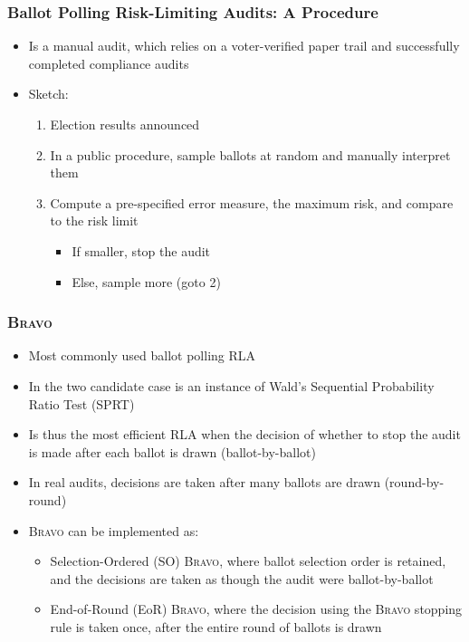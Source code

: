 \documentclass[aspectratio=169]{beamer}
\newcommand{\BRAVO}{\textsc{Bravo}\xspace}
\begin{document}
\begin{frame}
\frametitle{Ballot Polling Risk-Limiting Audits: A Procedure}

\begin{itemize}
\item Is a manual audit, which relies on a voter-verified paper trail and successfully completed compliance audits
\pause 
\item Sketch:
\begin{enumerate}
\item Election results announced
\pause 
\item In a public procedure, sample ballots at random and manually interpret them
\pause 
\item Compute a pre-specified error measure, the maximum risk, and compare to the risk limit
\begin{itemize}
\item If smaller, stop the audit
\item Else, sample more (goto 2)
\end{itemize}
\end{enumerate}
\end{itemize}
\end{frame}

\begin{frame}
\frametitle{\BRAVO}
\begin{itemize}
\item Most commonly used ballot polling RLA
\pause 
\item In the two candidate case is an instance of Wald's Sequential Probability Ratio Test (SPRT)
\pause 
\item Is thus the most efficient RLA when 
the decision of whether to stop the audit is made after each ballot is drawn (ballot-by-ballot)
\pause 
\item In real audits, decisions are taken after many ballots are drawn (round-by-round)
\pause 
\item \BRAVO can be implemented as:
\begin{itemize}
\item Selection-Ordered (SO) \BRAVO, 
where ballot selection order is retained, and the decisions are taken as though the audit were ballot-by-ballot
\item End-of-Round (EoR) \BRAVO, where
the decision using the \BRAVO stopping rule is taken once, after the entire round of ballots is drawn
\end{itemize}
\end{itemize}
\end{frame}
\end{document}
